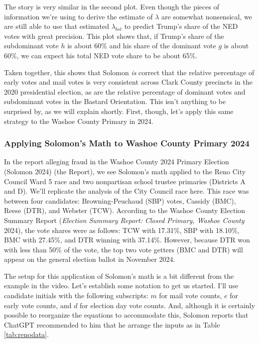 \documentclass[12pt]{article}
\begin{document}
The story is very similar in the second plot. Even though the pieces of information we're using to derive the estimate of \(\lambda\) are somewhat nonsensical, we are still able to use that estimated \(\lambda_{bst}\) to predict Trump's share of the NED votes with great precision. This plot shows that, if Trump's share of the subdominant vote \(h\) is about 60\% and his share of the dominant vote \(g\) is about 60\%, we can expect his total NED vote share to be about 65\%.

Taken together, this shows that Solomon \emph{is} correct that the relative percentage of early votes and mail votes is very consistent across Clark County precincts in the 2020 presidential election, as are the relative percentage of dominant votes and subdominant votes in the Bastard Orientation. This isn't anything to be surprised by, as we will explain shortly. First, though, let's apply this same strategy to the Washoe County Primary in 2024.

\subsubsection{Applying Solomon's Math to Washoe County Primary 2024}\label{applying-solomons-math-to-washoe-county-primary-2024}

In the report alleging fraud in the Washoe County 2024 Primary Election (Solomon 2024) (the Report), we see Solomon's math applied to the Reno City Council Ward 5 race and two nonpartisan school trustee primaries (Districts A and D). We'll replicate the analysis of the City Council race here. This race was between four candidates: Browning-Peuchaud (SBP) votes, Cassidy (BMC), Reese (DTR), and Webster (TCW). According to the Washoe County Election Summary Report (\emph{Election Summary Report: Closed Primary, Washoe County} 2024), the vote shares were as follows: TCW with 17.31\%, SBP with 18.10\%, BMC with 27.45\%, and DTR winning with 37.14\%. However, because DTR won with less than 50\% of the vote, the top two vote getters (BMC and DTR) will appear on the general election ballot in November 2024.

The setup for this application of Solomon's math is a bit different from the example in the video. Let's establish some notation to get us started. I'll use candidate initials with the following subscripts: \(m\) for mail vote counts, \(e\) for early vote counts, and \(d\) for election day vote counts. And, although it is certainly possible to reorganize the equations to accommodate this, Solomon reports that ChatGPT recommended to him that he arrange the inputs as in Table \ref{tab:renodata}.
\end{document}

